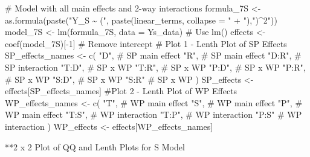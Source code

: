 \documentclass[
  letterpaper,
  DIV=11,
  numbers=noendperiod]{scrartcl}
\newenvironment{Shaded}{\begin{snugshade}}{\end{snugshade}}
\newcommand{\AttributeTok}[1]{\textcolor[rgb]{0.40,0.45,0.13}{#1}}
\newcommand{\CommentTok}[1]{\textcolor[rgb]{0.37,0.37,0.37}{#1}}
\newcommand{\DecValTok}[1]{\textcolor[rgb]{0.68,0.00,0.00}{#1}}
\newcommand{\FunctionTok}[1]{\textcolor[rgb]{0.28,0.35,0.67}{#1}}
\newcommand{\NormalTok}[1]{\textcolor[rgb]{0.00,0.23,0.31}{#1}}
\newcommand{\OtherTok}[1]{\textcolor[rgb]{0.00,0.23,0.31}{#1}}
\newcommand{\SpecialCharTok}[1]{\textcolor[rgb]{0.37,0.37,0.37}{#1}}
\newcommand{\StringTok}[1]{\textcolor[rgb]{0.13,0.47,0.30}{#1}}
\begin{document}
\begin{Shaded}
\begin{Highlighting}[]
\CommentTok{\# Model with all main effects and 2{-}way interactions}
\NormalTok{formula\_7S }\OtherTok{\textless{}{-}} \FunctionTok{as.formula}\NormalTok{(}\FunctionTok{paste}\NormalTok{(}\StringTok{"Y\_S \textasciitilde{} ("}\NormalTok{, }
    \FunctionTok{paste}\NormalTok{(linear\_terms, }\AttributeTok{collapse =} \StringTok{" + "}\NormalTok{),}\StringTok{")\^{}2"}\NormalTok{))}
\NormalTok{model\_7S }\OtherTok{\textless{}{-}} \FunctionTok{lm}\NormalTok{(formula\_7S, }\AttributeTok{data =}\NormalTok{ Ys\_data)  }\CommentTok{\# Use lm()}
\NormalTok{effects }\OtherTok{\textless{}{-}} \FunctionTok{coef}\NormalTok{(model\_7S)[}\SpecialCharTok{{-}}\DecValTok{1}\NormalTok{]    }\CommentTok{\# Remove intercept}
\CommentTok{\# Plot 1 {-} Lenth Plot of SP Effects}
\NormalTok{SP\_effects\_names }\OtherTok{\textless{}{-}} \FunctionTok{c}\NormalTok{(}
  \StringTok{"D"}\NormalTok{,    }\CommentTok{\# SP main effect}
  \StringTok{"R"}\NormalTok{,    }\CommentTok{\# SP main effect}
  \StringTok{"D:R"}\NormalTok{,  }\CommentTok{\# SP interaction}
  \StringTok{"T:D"}\NormalTok{,  }\CommentTok{\# SP x WP}
  \StringTok{"T:R"}\NormalTok{,  }\CommentTok{\# SP x WP}
  \StringTok{"P:D"}\NormalTok{,  }\CommentTok{\# SP x WP}
  \StringTok{"P:R"}\NormalTok{,  }\CommentTok{\# SP x WP}
  \StringTok{"S:D"}\NormalTok{,  }\CommentTok{\# SP x WP}
  \StringTok{"S:R"}   \CommentTok{\# SP x WP}
\NormalTok{)}
\NormalTok{SP\_effects }\OtherTok{\textless{}{-}}\NormalTok{ effects[SP\_effects\_names]}
\CommentTok{\#Plot 2 {-} Lenth Plot of WP Effects}
\NormalTok{WP\_effects\_names }\OtherTok{\textless{}{-}} \FunctionTok{c}\NormalTok{(}
  \StringTok{"T"}\NormalTok{,    }\CommentTok{\# WP main effect}
  \StringTok{"S"}\NormalTok{,    }\CommentTok{\# WP main effect}
  \StringTok{"P"}\NormalTok{,    }\CommentTok{\# WP main effect}
  \StringTok{"T:S"}\NormalTok{,  }\CommentTok{\# WP interaction}
  \StringTok{"T:P"}\NormalTok{,  }\CommentTok{\# WP interaction}
  \StringTok{"P:S"}   \CommentTok{\# WP interaction}
\NormalTok{)}
\NormalTok{WP\_effects }\OtherTok{\textless{}{-}}\NormalTok{ effects[WP\_effects\_names]}
\end{Highlighting}
\end{Shaded}

**2 x 2 Plot of QQ and Lenth Plots for S Model
\end{document}
